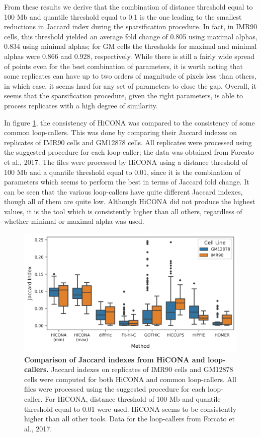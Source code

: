 From these results we derive that the combination of distance threshold equal to 100 Mb and quantile threshold equal to 0.1 is the one leading to the smallest reductions in Jaccard index during the sparsification procedure. In fact, in IMR90 cells, this threshold yielded an average fold change of 0.805 using maximal alphas, 0.834 using minimal alphas; for GM cells the thresholds for maximal and minimal alphas were 0.866 and 0.928, respectively. While there is still a fairly wide spread of points even for the best combination of parameters, it is worth noting that some replicates can have up to two orders of magnitude of pixels less than others, in which case, it seems hard for any set of parameters to close the gap. Overall, it seems that the sparsification procedure, given the right parameters, is able to process replicates with a high degree of similarity.

In figure \ref{fig:jaccardtools}, the consistency of HiCONA was compared to the consistency of some common loop-callers. This was done by comparing their Jaccard indexes on replicates of IMR90 cells and GM12878 cells. All replicates were processed using the suggested procedure for each loop-caller; the data was obtained from Forcato et al., 2017. The files were processed by HiCONA using a distance threshold of 100 Mb and a quantile threshold equal to 0.01, since it is the combination of parameters which seems to perform the best in terms of Jaccard fold change. It can be seen that the various loop-callers have quite different Jaccard indexes, though all of them are quite low. Although HiCONA did not produce the highest values, it is the tool which is consistently higher than all others, regardless of whether minimal or maximal alpha was used.

\begin{figure}[h]
  \centering 
  \includegraphics[width=1\textwidth]{jaccard_tools.png}
  \caption{\textbf{Comparison of Jaccard indexes from HiCONA and loop-callers.} Jaccard indexes on replicates of IMR90 cells and GM12878 cells were computed for both HiCONA and common loop-callers. All files were processed using the suggested procedure for each loop-caller. For HiCONA, distance threshold of 100 Mb and quantile threshold equal to 0.01 were used. HiCONA seems to be consistently higher than all other tools. Data for the loop-callers from Forcato et al., 2017.}
  \label{fig:jaccardtools}
\end{figure}
